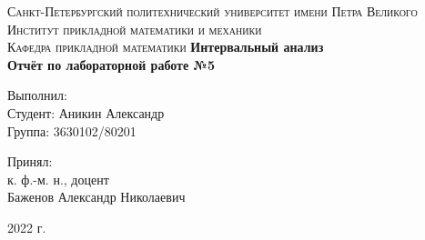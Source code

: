 



\begin{titlepage}
    \begin{center}
        \textsc{
            Санкт-Петербургский политехнический университет имени Петра Великого \\[5mm]
            Институт прикладной математики и механики\\[2mm]
            Кафедра прикладной математики
        }   
        \vfill
        \textbf{\large
            Интервальный анализ\\
            Отчёт по лабораторной работе №5 \\[3mm]
        }                
    \end{center}

    \vfill
    \hfill
    \begin{minipage}{0.5\textwidth}
        Выполнил: \\[2mm]   
		Студент: Аникин Александр \\
		Группа: 3630102/80201\\
    \end{minipage}

	\hfill
	\begin{minipage}{0.5\textwidth}
		Принял: \\[2mm]
		к. ф.-м. н., доцент \\   
		Баженов Александр Николаевич
	\end{minipage}

    \vfill
    \begin{center}
        2022 г.
    \end{center}
\end{titlepage}
